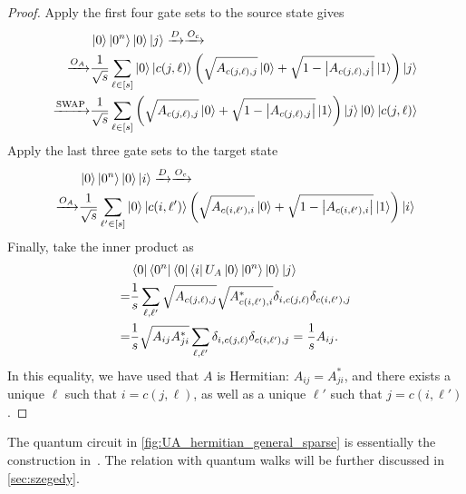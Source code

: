 \begin{proof}
Apply the first four gate sets to the source state gives
\begin{equation}
\begin{split}
&\ket{0}\ket{0^n}\ket{0}\ket{j}\xrightarrow{D}\xrightarrow{O_c}\\
\xrightarrow{O_A}& \frac{1}{\sqrt{s}}\sum_{\ell\in[s]} 
\ket{0}\ket{c(j,\ell)}\left(\sqrt{A_{c(j,\ell),j}}\ket{0}+\sqrt{1-\left\lvert A_{c(j,\ell),j}\right\rvert}\ket{1}\right)\ket{j}\\
\xrightarrow{\operatorname{SWAP}}& \frac{1}{\sqrt{s}}\sum_{\ell\in[s]} \left(\sqrt{A_{c(j,\ell),j}}\ket{0}+\sqrt{1-\left\lvert A_{c(j,\ell),j}\right\rvert}\ket{1}\right)\ket{j}\ket{0}\ket{c(j,\ell)}
\end{split}
\end{equation}
Apply the last three gate sets to the target state
\begin{equation}
\begin{split}
&\ket{0}\ket{0^n}\ket{0}\ket{i}\xrightarrow{D}\xrightarrow{O_c}\\
\xrightarrow{O_A}& \frac{1}{\sqrt{s}}\sum_{\ell'\in[s]} 
\ket{0}\ket{c(i,\ell')}\left(\sqrt{A_{c(i,\ell'),i}}\ket{0}+\sqrt{1-\left\lvert A_{c(i,\ell'),i}\right\rvert}\ket{1}\right)\ket{i}
\end{split}
\end{equation}
Finally, take the inner product as
\begin{equation}
\begin{split}
&\bra{0}\bra{0^n}\bra{0}\bra{i}U_A\ket{0}\ket{0^n}\ket{0}\ket{j}\\
=&\frac{1}{s}\sum_{\ell,\ell'} \sqrt{A_{c(j,\ell),j}} \sqrt{A^*_{c(i,\ell'),i}}\delta_{i,c(j,\ell)}\delta_{c(i,\ell'),j}\\
=&\frac{1}{s}\sqrt{A_{ij}A_{ji}^*}\sum_{\ell,\ell'} \delta_{i,c(j,\ell)}\delta_{c(i,\ell'),j}=\frac{1}{s}A_{ij}.
\end{split}
\end{equation}
In this equality, we have used that $A$ is Hermitian: $A_{ij}=A_{ji}^*$, and there exists a unique $\ell$ such that $i=c(j,\ell)$, as well as a unique $\ell'$ such that $j=c(i,\ell')$.
\end{proof}


The quantum circuit in \cref{fig:UA_hermitian_general_sparse} is essentially the construction in~\cite{ChildsKothariSomma2017}. The relation with quantum walks will be further discussed in \cref{sec:szegedy}.


\vspace{2em}

